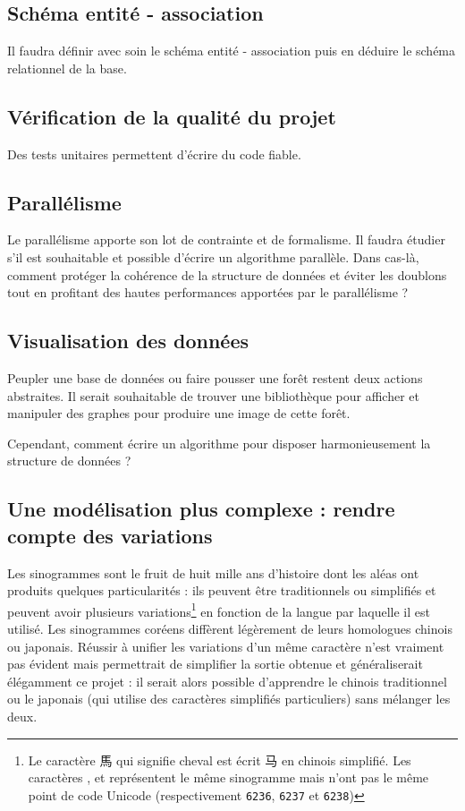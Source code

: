 \documentclass[12pt,oneside]{article}
\begin{document}
\subsection{Schéma entité - association}

Il faudra définir avec soin le schéma entité - association puis en déduire le schéma relationnel de la base.

\subsection{Vérification de la qualité du projet}

Des tests unitaires permettent d'écrire du code fiable.

\subsection{Parallélisme}

Le parallélisme apporte son lot de contrainte et de formalisme. Il faudra étudier s'il est souhaitable et possible d'écrire un algorithme parallèle. Dans cas-là, comment protéger la cohérence de la structure de données et éviter les doublons tout en profitant des hautes performances apportées par le parallélisme ?

\subsection{Visualisation des données}

Peupler une base de données ou faire pousser une forêt restent deux actions abstraites. Il serait souhaitable de trouver une bibliothèque pour afficher et manipuler des graphes pour produire une image de cette forêt.

Cependant, comment écrire un algorithme pour disposer harmonieusement la structure de données ?

\subsection{Une modélisation plus complexe : rendre compte des variations}

Les sinogrammes sont le fruit de huit mille ans d'histoire dont les aléas ont produits quelques particularités : ils peuvent être traditionnels ou simplifiés et peuvent avoir plusieurs variations\footnote{Le caractère {馬} qui signifie cheval est écrit 马 en chinois simplifié. Les caractères ,  et  représentent le même sinogramme mais n'ont pas le même point de code Unicode (respectivement \texttt{6236}, \texttt{6237} et \texttt{6238})} en fonction de la langue par laquelle il est utilisé. Les \og sinogrammes \fg{} coréens diffèrent légèrement de leurs homologues chinois ou japonais. Réussir à unifier les variations d'un même caractère n'est vraiment pas évident mais permettrait de simplifier la sortie obtenue et généraliserait élégamment ce projet : il serait alors possible d'apprendre le chinois traditionnel ou le japonais (qui utilise des caractères simplifiés particuliers) sans mélanger les deux.
\end{document}
